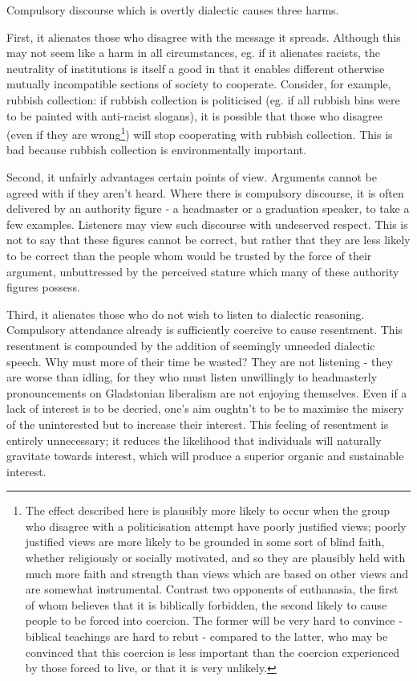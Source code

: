 \documentclass[12pt,a4paper]{report}
\begin{document}
\begin{multicols}{2}
\begin{multicols}{2}
Compulsory discourse which is overtly dialectic causes three harms.

First, it alienates those who disagree with the message it spreads.
Although this may not seem like a harm in all circumstances, eg. if it
alienates racists, the neutrality of institutions is itself a good in
that it enables different otherwise mutually incompatible sections of
society to cooperate. Consider, for example, rubbish collection: if
rubbish collection is politicised (eg. if all rubbish bins were to be
painted with anti-racist slogans), it is possible that those who
disagree (even if they are wrong\footnote{The effect described here is
	plausibly more likely to occur when the group who disagree with a
	politicisation attempt have poorly justified views; poorly justified
	views are more likely to be grounded in some sort of blind faith,
	whether religiously or socially motivated, and so they are plausibly
	held with much more faith and strength than views which are based on
	other views and are somewhat instrumental. Contrast two opponents of
	euthanasia, the first of whom believes that it is biblically
	forbidden, the second likely to cause people to be forced into
	coercion. The former will be very hard to convince - biblical
	teachings are hard to rebut - compared to the latter, who may be
	convinced that this coercion is less important than the coercion
	experienced by those forced to live, or that it is very unlikely.})
will stop cooperating with rubbish collection. This is bad because
rubbish collection is environmentally important.

Second, it unfairly advantages certain points of view. Arguments cannot
be agreed with if they aren't heard. Where there is compulsory
discourse, it is often delivered by an authority figure - a headmaster
or a graduation speaker, to take a few examples. Listeners may view such
discourse with undeserved respect. This is not to say that these figures
cannot be correct, but rather that they are less likely to be correct
than the people whom would be trusted by the force of their argument,
unbuttressed by the perceived stature which many of these authority
figures possess.

Third, it alienates those who do not wish to listen to dialectic
reasoning. Compulsory attendance already is sufficiently coercive to
cause resentment. This resentment is compounded by the addition of
seemingly unneeded dialectic speech. Why must more of their time be
wasted? They are not listening - they are worse than idling, for they
who must listen unwillingly to headmasterly pronouncements on
Gladstonian liberalism are not enjoying themselves. Even if a lack of
interest is to be decried, one's aim oughtn't to be to maximise the
misery of the uninterested but to increase their interest. This feeling
of resentment is entirely unnecessary; it reduces the likelihood that
individuals will naturally gravitate towards interest, which will
produce a superior organic and sustainable interest.


\end{multicols}
\end{multicols}
\end{document}
